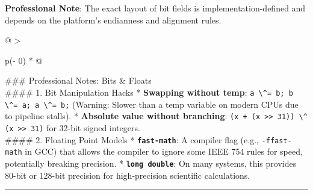 \textbf{Professional Note}: The exact layout of bit fields is
implementation-defined and depends on the platform's endianness and
alignment rules.

\begin{longtable}[]{@{}
  >{\raggedright\arraybackslash}p{(\columnwidth - 0\tabcolsep) * }@{}}
\toprule
\endhead
\#\#\# Professional Notes: Bits \& Floats \\
\#\#\#\# 1. Bit Manipulation Hacks * \textbf{Swapping without temp}:
\passthrough{\lstinline!a \^= b; b \^= a; a \^= b;!} (Warning: Slower
than a temp variable on modern CPUs due to pipeline stalls). *
\textbf{Absolute value without branching}:
\passthrough{\lstinline!(x + (x >> 31)) \^ (x >> 31)!} for 32-bit signed
integers. \\
\#\#\#\# 2. Floating Point Models *
\textbf{\passthrough{\lstinline!fast-math!}}: A compiler flag (e.g.,
\passthrough{\lstinline!-ffast-math!} in GCC) that allows the compiler
to ignore some IEEE 754 rules for speed, potentially breaking precision.
* \textbf{\passthrough{\lstinline!long double!}}: On many systems, this
provides 80-bit or 128-bit precision for high-precision scientific
calculations. \\
\bottomrule
\end{longtable}

\begin{center}\rule{0.5\linewidth}{0.5pt}\end{center}
